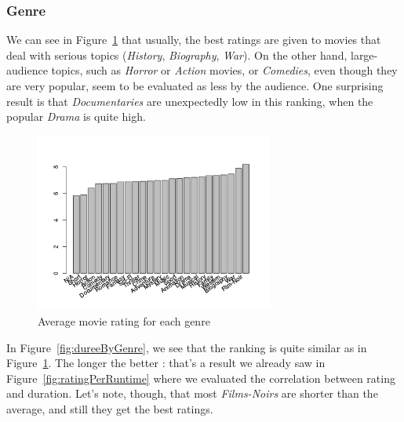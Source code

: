 \newpage
\subsubsection{Genre}
\label{subs:Genre}

We can see in Figure~\ref{fig:rateByGenre} that usually, the best ratings are given to movies that deal with serious topics (\textit{History}, \textit{Biography}, \textit{War}).
On the other hand, large-audience topics, such as \textit{Horror} or \textit{Action} movies, or \textit{Comedies}, even though they are very popular, seem to be evaluated as less  by the audience.
One surprising result is that \textit{Documentaries} are unexpectedly low in this ranking, when the popular \textit{Drama} is quite high.

\begin{figure}[!h]
\begin{center}
\includegraphics[width=0.70\textwidth]{../src/pre-processing/stats/results/rateByGenre.png}
\end{center}
\caption{Average movie rating for each genre}
\label{fig:rateByGenre}
\end{figure}

In Figure~\ref{fig:dureeByGenre}, we see that the ranking is quite similar as in Figure~\ref{fig:rateByGenre}.
The longer the better : that's a result we already saw in Figure~\ref{fig:ratingPerRuntime} where we evaluated the correlation between rating and duration.
Let's note, though, that most \textit{Films-Noirs} are shorter than the average, and still they get the best ratings.

